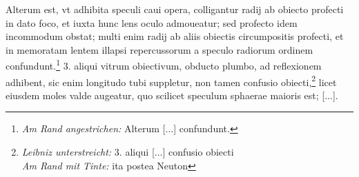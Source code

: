 \pend \pstart [p.~158] [...] Alterum est, vt adhibita speculi\protect{} caui opera, colligantur radij\protect{} ab obiecto profecti in dato foco\protect{}, et iuxta hunc lens\protect{} oculo\protect{} admoueatur; sed profecto idem incommodum obstat; multi enim radij\protect{} ab aliis obiectis circumpositis profecti, et in memoratam lentem\protect{} illapsi repercussorum a speculo\protect{} radiorum\protect{} ordinem confundunt.\footnote{\textit{Am Rand angestrichen:} Alterum [...] confundunt.} 3. aliqui vitrum obiectivum\protect{}, obducto plumbo\protect{}, ad reflexionem\protect{} adhibent, sic enim longitudo tubi suppletur, non tamen confusio obiecti,\footnote{\textit{Leibniz unterstreicht:} 3. aliqui [...] confusio obiecti \\ \textit{Am Rand mit Tinte:} ita postea Neuton\protect{}} licet eiusdem moles valde augeatur, quo scilicet speculum\protect{} sphaerae maioris est; [...].